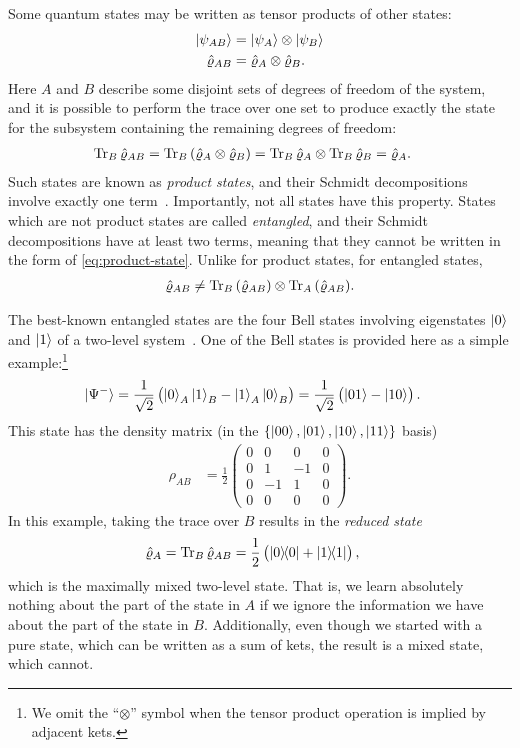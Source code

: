 Some quantum states may be written as tensor products of other states:
\begin{subequations} \label{eq:product-state}
\begin{align}
	\ket{\psi_{AB}}
	&= \ket{\psi_A} \otimes \ket{\psi_B} \\
	\hat{\varrho}_{AB}
	&= \hat{\varrho}_A \otimes \hat{\varrho}_B.
\end{align}
\end{subequations}
Here $A$ and $B$ describe some disjoint sets of degrees of freedom of the system, and it is possible to perform the trace over one set to produce exactly the state for the subsystem containing the remaining degrees of freedom:
\begin{align}
	\operatorname{Tr}_B{\hat{\varrho}_{AB}}
	&= \operatorname{Tr}_B{(\hat{\varrho}_A \otimes \hat{\varrho}_B)}
	= \operatorname{Tr}_B{\hat{\varrho}_A} \otimes \operatorname{Tr}_B{\hat{\varrho}_B}
	= \hat{\varrho}_A.
\end{align}
Such states are known as \emph{product states}, and their Schmidt decompositions involve exactly one term~\cite[94]{wilde2013quantum}.
Importantly, not all states have this property.
States which are not product states are called \emph{entangled}, and their Schmidt decompositions have at least two terms, meaning that they cannot be written in the form of \cref{eq:product-state}.
Unlike for product states, for entangled states,
\begin{align}
	\hat{\varrho}_{AB}
	\ne \operatorname{Tr}_B{(\hat{\varrho}_{AB})} \otimes \operatorname{Tr}_A{(\hat{\varrho}_{AB})}.
\end{align}

The best-known entangled states are the four Bell states involving eigenstates $\ket{0}$ and $\ket{1}$ of a two-level system~\cite[88]{wilde2013quantum}.
One of the Bell states is provided here as a simple example:\footnote{
	We omit the ``$\otimes$'' symbol when the tensor product operation is implied by adjacent kets.
}
\begin{align}
	\ket{\Psi^-}
	&= \frac{1}{\sqrt{2}} \left( \ket{0}_A \ket{1}_B - \ket{1}_A \ket{0}_B \right)
	= \frac{1}{\sqrt{2}} \left( \ket{01} - \ket{10} \right).
\end{align}
This state has the density matrix (in the $\{ \ket{00}, \ket{01}, \ket{10}, \ket{11} \}$ basis)
\begin{align}
	\rho_{AB}
	&= \frac{1}{2} \begin{pmatrix}
			0 & 0 & 0 & 0 \\
			0 & 1 & -1 & 0 \\
			0 & -1 & 1 & 0 \\
			0 & 0 & 0 & 0
		\end{pmatrix}.
\end{align}
In this example, taking the trace over $B$ results in the \emph{reduced state}
\begin{align}
	\hat{\varrho}_A
	&= \operatorname{Tr}_B{\hat{\varrho}_{AB}}
	= \frac{1}{2} \left( \ket{0}\!\!\bra{0} + \ket{1}\!\!\bra{1} \right),
		\label{eq:bell-reduced}
\end{align}
which is the maximally mixed two-level state.
That is, we learn absolutely nothing about the part of the state in $A$ if we ignore the information we have about the part of the state in $B$.
Additionally, even though we started with a pure state, which can be written as a sum of kets, the result is a mixed state, which cannot.

